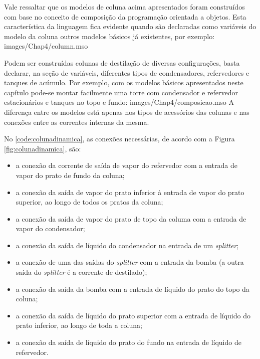 Vale ressaltar que os modelos de coluna acima apresentados foram construídos com base no conceito de composição
da programação orientada a objetos. Esta característica da linguagem fica evidente quando são declaradas
como variáveis do modelo da coluna outros modelos básicos já existentes, por exemplo:
 {images/Chap4/column.mso}

Podem ser construídas colunas de destilação de diversas configurações, basta
declarar, na seção de variáveis, diferentes tipos de condensadores,
refervedores e tanques de acúmulo.
Por exemplo, com os modelos básicos apresentados neste capítulo pode-se montar
facilmente uma torre com condensador e refervedor estacionários e tanques no topo e fundo:
 {images/Chap4/composicao.mso}
A diferença entre os modelos está apenas nos tipos de acessórios das colunas e nas conexões entre as correntes internas
da mesma.

No \autoref{code:colunadinamica}, as conexões necessárias, de acordo com a Figura \autoref{fig:colunadinamica}, são:
\begin{itemize}
 \item a conexão da corrente de saída de vapor do refervedor com a entrada de vapor do prato de fundo da coluna;
 \item a conexão da saída de vapor do prato inferior à entrada de vapor do prato superior, ao longo de
todos os pratos da coluna;
 \item a conexão da saída de vapor do prato de topo da columa com a entrada de vapor do condensador;
 \item a conexão da saída de líquido do condensador na entrada de um \textit{splitter};
 \item a conexão de uma das saídas do \textit{splitter} com a entrada da bomba (a outra saída do \textit{splitter} é a
corrente de destilado);
 \item a conexão da saída da bomba com a entrada de líquido do prato do topo da coluna;
 \item a conexão da saída de líquido do prato superior com a entrada de líquido do prato inferior, ao longo de toda
a coluna;
 \item a conexão da saída de líquido do prato do fundo na entrada de líquido de refervedor.
\end{itemize}


